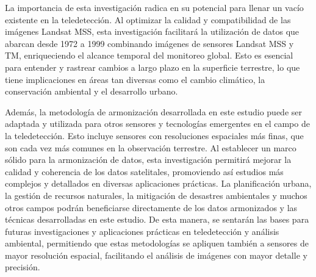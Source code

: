         La importancia de esta investigación radica en su potencial para llenar un vacío existente en la teledetección. Al optimizar la calidad y compatibilidad de las imágenes Landsat MSS, esta investigación facilitará la utilización de datos que abarcan desde 1972 a 1999 combinando imágenes de sensores Landsat MSS y TM, enriqueciendo el alcance temporal del monitoreo global. Esto es esencial para entender y rastrear cambios a largo plazo en la superficie terrestre, lo que tiene implicaciones en áreas tan diversas como el cambio climático, la conservación ambiental y el desarrollo urbano.
        
        Además, la metodología de armonización desarrollada en este estudio puede ser adaptada y utilizada para otros sensores y tecnologías emergentes en el campo de la teledetección. Esto incluye sensores con resoluciones espaciales más finas, que son cada vez más comunes en la observación terrestre. Al establecer un marco sólido para la armonización de datos, esta investigación permitirá mejorar la calidad y coherencia de los datos satelitales, promoviendo así estudios más complejos y detallados en diversas aplicaciones prácticas. La planificación urbana, la gestión de recursos naturales, la mitigación de desastres ambientales y muchos otros campos podrán beneficiarse directamente de los datos armonizados y las técnicas desarrolladas en este estudio. De esta manera, se sentarán las bases para futuras investigaciones y aplicaciones prácticas en teledetección y análisis ambiental, permitiendo que estas metodologías se apliquen también a sensores de mayor resolución espacial, facilitando el análisis de imágenes con mayor detalle y precisión.


        
